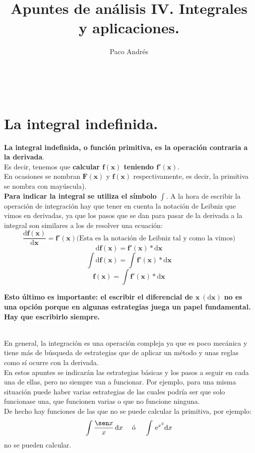 \documentclass[a4paper,11pt,answers]{exam}
\def \autor{Paco Andrés}
\def \titulo{Apuntes de análisis IV. Integrales y aplicaciones.}
\begin{document}
\newcommand{\e}{\,\mathrm{e}}
\newcommand{\asen}{\,\mathrm{asen}\,}
\newcommand{\acos}{\,\mathrm{acos}\,}
\newcommand{\atg}{\,\mathrm{atg}\,}

\newcommand\dif[1]{\mathrm{d}#1}
\newcommand\integral[2]{\int #1\,\dif{#2}}
\newcommand\integrald[4]{\int_{#3}^{#4} #1\,\dif{#2}}
\title{\titulo}
\date{}
\author{\autor}
\maketitle

\begin{center}
\doclicenseLongText\\
\vspace{.25cm}
\doclicenseImage
\end{center}

\section{La integral indefinida.}
\textbf{La integral indefinida, o función primitiva, es la operación contraria a la derivada}.\\
Es decir, tenemos que \textbf{calcular $\boldsymbol{f(x)}$ teniendo $\boldsymbol{f'(x)}$}.\\
En ocasiones se nombran $\boldsymbol{F(x)}$ y $\boldsymbol{f(x)}$ respectivamente, es decir, la primitiva se nombra con mayúscula).\\

\textbf{Para indicar la integral se utiliza el símbolo $\boldsymbol\int$}. A la hora de escribir la operación de integración hay que tener en cuenta la notación de Leibniz que vimos en derivadas, ya que los pasos que se dan para pasar de la derivada a la integral son similares a los de resolver una ecuación:
\[\boldsymbol{\frac{\dif{f(x)}}{\dif{x}} = f'(x)} \text{(Esta es la notación de Leibniz tal y como la vimos)}\]
\[\boldsymbol{\dif{f(x)} = f'(x)*\dif{x}}\]
\[\boldsymbol{\int \dif{f(x)} = \int f'(x)*\dif{x}}\]
\[\boldsymbol{f(x) = \int f'(x)*\dif{x}}\]
\begin{Large}
\textbf{Esto último es importante: el escribir el diferencial de $\boldsymbol{x\ (\dif{x})}$ no es una opción porque en algunas estrategias juega un papel fundamental. Hay que escribirlo siempre.}
\end{Large}\\

\vspace{0,5cm}
En general, la integración es una operación compleja ya que es poco mecánica y tiene más de búsqueda de estrategias que de aplicar un método y unas reglas como sí ocurre con la derivada.\\
En estos apuntes se indicarán las estrategias básicas y los pasos a seguir en cada una de ellas, pero no siempre van a funcionar. Por ejemplo, para una misma situación puede haber varias estrategias de las cuales podría ser que solo funcionase una, que funcionen varias o que no funcione ninguna.\\
De hecho hay funciones de las que no se puede calcular la primitiva, por ejemplo:
\[\int \frac{\sen x}{x}\,\dif{x}\quad \text{ ó }\quad \int \e^{x^2} \dif{x}\]
no se pueden calcular.\\
\end{document}
